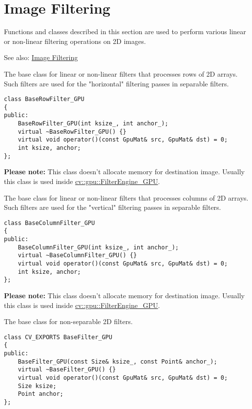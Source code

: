 \section{Image Filtering}

Functions and classes described in this section are used to perform various linear or non-linear filtering operations on 2D images.

See also: \hyperref[section.cpp.cpu.ImageFiltering]{Image Filtering}


\label{class.gpu.BaseRowFilter}
The base class for linear or non-linear filters that processes rows of 2D arrays. Such filters are used for the "horizontal" filtering passes in separable filters.

\begin{lstlisting}
class BaseRowFilter_GPU
{
public:
    BaseRowFilter_GPU(int ksize_, int anchor_);
    virtual ~BaseRowFilter_GPU() {}
    virtual void operator()(const GpuMat& src, GpuMat& dst) = 0;
    int ksize, anchor;
};
\end{lstlisting}

\textbf{Please note:} This class doesn't allocate memory for destination image. Usually this class is used inside \hyperref[class.gpu.FilterEngine]{cv::gpu::FilterEngine\_GPU}.


\label{class.gpu.BaseColumnFilter}
The base class for linear or non-linear filters that processes columns of 2D arrays. Such filters are used for the "vertical" filtering passes in separable filters.

\begin{lstlisting}
class BaseColumnFilter_GPU
{
public:
    BaseColumnFilter_GPU(int ksize_, int anchor_);
    virtual ~BaseColumnFilter_GPU() {}
    virtual void operator()(const GpuMat& src, GpuMat& dst) = 0;
    int ksize, anchor;
};
\end{lstlisting}

\textbf{Please note:} This class doesn't allocate memory for destination image. Usually this class is used inside \hyperref[class.gpu.FilterEngine]{cv::gpu::FilterEngine\_GPU}.


\label{class.gpu.BaseFilter}
The base class for non-separable 2D filters. 

\begin{lstlisting}
class CV_EXPORTS BaseFilter_GPU
{
public:
    BaseFilter_GPU(const Size& ksize_, const Point& anchor_);
    virtual ~BaseFilter_GPU() {}
    virtual void operator()(const GpuMat& src, GpuMat& dst) = 0;
    Size ksize;
    Point anchor;
};
\end{lstlisting}

